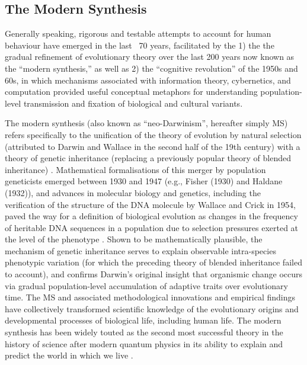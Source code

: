 
\subsection{The Modern Synthesis}
Generally speaking, rigorous and testable attempts to account for human behaviour have emerged in the last ~70 years, facilitated by the 1) the the gradual refinement of evolutionary theory over the last 200 years now known as the ``modern synthesis,'' as well as 2) the ``cognitive revolution'' of the 1950s and 60s, in which mechanisms associated with information theory, cybernetics, and computation provided useful conceptual metaphors for understanding population-level transmission and fixation of biological and cultural variants.

The modern synthesis (also known as ``neo-Darwinism'', hereafter simply MS) refers specifically to the unification of the theory of evolution by natural selection (attributed to Darwin and Wallace in the second half of the 19th century) with a theory of genetic inheritance (replacing a previously popular theory of blended inheritance) \citep{Huxley1942}.  Mathematical formalisations of this merger by population geneticists emerged between 1930 and 1947 (e.g., Fisher (1930) and Haldane (1932)), and advances in molecular biology and genetics, including the verification of the structure of the DNA molecule by Wallace and Crick in 1954, paved the way for a definition of biological evolution as changes in the frequency of heritable DNA sequences in a population due to selection pressures exerted at the level of the phenotype \citep{Dawkins1976,Grafen1984}.  Shown to be mathematically plausible, the mechanism of genetic inheritance serves to explain observable intra-species phenotypic variation (for which the preceding theory of blended inheritance failed to account), and confirms Darwin's original insight that organismic change occurs via gradual population-level accumulation of adaptive traits over evolutionary time. The MS and associated methodological innovations and empirical findings have collectively transformed scientific knowledge of the evolutionary origins and developmental processes of biological life, including human life. The modern synthesis has been widely touted as the second most successful theory in the history of science after modern quantum physics in its ability to explain and predict the world in which we live \citep{Dunbar1996}.

